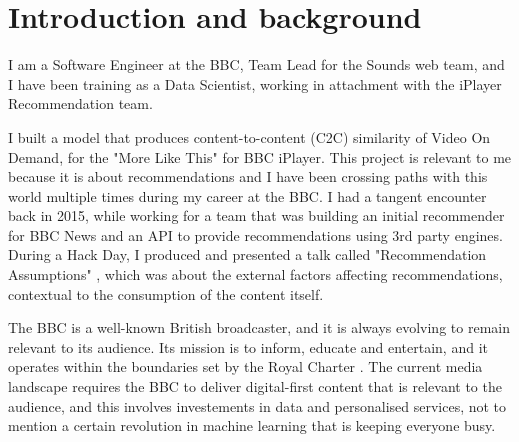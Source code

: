 
\section{Introduction and background}

I am a Software Engineer at the BBC, Team Lead for the Sounds web team, and I have been training as a Data Scientist,
working in attachment with the iPlayer Recommendation team.

I built a model that produces content-to-content (C2C) similarity of Video On Demand, for the "More Like This" \cite{MoreLikeBluey} for BBC iPlayer.
This project is relevant to me because it is about recommendations and I have been crossing paths with this world multiple times during my career at the BBC.
I had a tangent encounter back in 2015, while working for a team that was building
an initial recommender for BBC News and an API to provide recommendations using 3rd party engines.
During a Hack Day, I produced and presented a talk called
"Recommendation Assumptions" \cite{RecsAssumptions}, which was about the external factors affecting recommendations, contextual to the consumption
of the content itself.

The BBC is a well-known British broadcaster, and it is always evolving to remain relevant to its audience. Its mission
is to inform, educate and entertain, and it operates within the boundaries set by the Royal Charter \cite{RoyalCharterBBC}.
The current media landscape requires the BBC to deliver digital-first content that is relevant to the audience,
and this involves investements in data and personalised services, not to mention a certain revolution in machine learning
that is keeping everyone busy.
